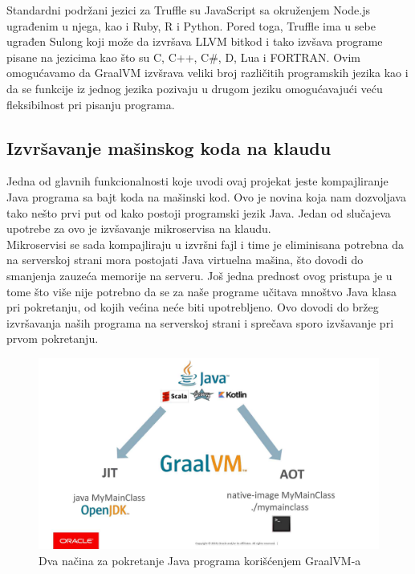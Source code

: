 \documentclass[a4paper]{article}
\begin{document}
Standardni podržani jezici za Truffle su JavaScript sa okruženjem Node.js ugrađenim u njega, kao i Ruby, R i Python. Pored toga, Truffle ima u sebe ugrađen Sulong koji može da izvršava LLVM bitkod i tako izvšava programe pisane na jezicima kao što su C, C++, C\#, D, Lua i FORTRAN. Ovim omogućavamo da GraalVM izvšrava veliki broj različitih programskih jezika kao i da se funkcije iz jednog jezika pozivaju u drugom jeziku omogućavajući veću fleksibilnost pri pisanju programa.

\subsection{Izvršavanje mašinskog koda na klaudu}
\label{sub:Izvršavanje mašinskog koda na klaudu}

Jedna od glavnih funkcionalnosti koje uvodi ovaj projekat jeste kompajliranje Java programa sa bajt koda na mašinski kod. Ovo je novina koja nam dozvoljava tako nešto prvi put od kako postoji programski jezik Java. Jedan od slučajeva upotrebe za ovo je izvšavanje mikroservisa na klaudu. \\

Mikroservisi se sada kompajliraju u izvršni fajl i time je eliminisana potrebna da na serverskoj strani mora postojati Java virtuelna mašina, što dovodi do smanjenja zauzeća memorije na serveru. Još jedna prednost ovog pristupa je u tome što više nije potrebno da se za naše programe učitava mnoštvo Java klasa pri pokretanju, od kojih većina neće biti upotrebljeno. Ovo dovodi do bržeg izvršavanja naših programa na serverskoj strani i sprečava sporo izvšavanje pri prvom pokretanju. 


\begin{figure}
	\begin{center}
	\includegraphics[scale=0.25]{imgs/run_java.jpg}
	\end{center}
	\caption{Dva načina za pokretanje Java programa korišćenjem GraalVM-a}
	\label{fig:run java}
\end{figure}
\end{document}
